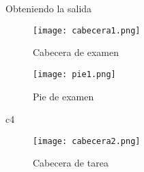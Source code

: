 Obteniendo la salida \\
\begin{figure}[H]
\texttt{[image: cabecera1.png]} 
\caption{Cabecera de examen}
\end{figure}
\begin{figure}[H]
\texttt{[image: pie1.png]} 
\caption{Pie de examen}
\end{figure}
\begin{source}[Taller]{c4}
\renewcommand{\headrule}{
\begin{minipage}{1\textwidth}
\hrule width \hsize \kern 1mm \hrule width \hsize height 2pt 
\end{minipage}}
\renewcommand\footrule{\begin{minipage}{1\textwidth}
\hrule width \hsize height 2pt \kern 1mm \hrule width \hsize   
\end{minipage}\par}
\end{source}
\begin{figure}[H]
\texttt{[image: cabecera2.png]} 
\caption{Cabecera de tarea}
\end{figure}
